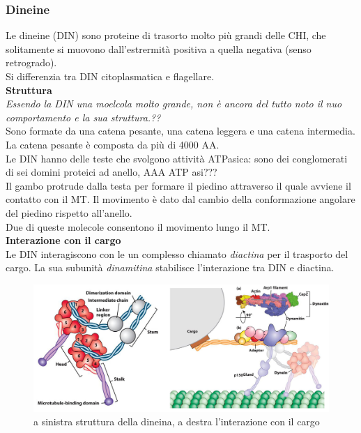         \subsubsection{Dineine}
            Le dineine (DIN) sono proteine di trasorto molto più grandi delle CHI, che solitamente si muovono dall'estrermità positiva a quella negativa (senso retrogrado). \\
            Si differenzia tra DIN citoplasmatica e flagellare.\\
            
            \textbf{Struttura}\\
                \textit{Essendo la DIN una moelcola molto grande, non è ancora del tutto noto il nuo comportamento e la sua struttura.??\\}
                Sono formate da una catena pesante, una catena leggera e una catena intermedia. La catena pesante è composta da più di 4000 AA.\\
                Le DIN hanno delle teste che svolgono attività ATPasica: sono dei conglomerati di sei domini proteici ad anello, AAA ATP asi???\\
                Il gambo protrude dalla testa per formare il piedino attraverso il quale avviene il contatto con il MT. Il movimento è dato dal cambio della conformazione angolare del piedino rispetto all'anello.\\
                Due di queste molecole consentono il movimento lungo il MT.\\
                
            \textbf{Interazione con il cargo}\\
                Le DIN interagiscono con le un complesso chiamato \textit{diactina} per il trasporto del cargo. La sua subunità \textit{dinamitina} stabilisce l'interazione tra DIN e diactina.
                \begin{figure}[h]
                    \centering
                    \includegraphics[width=1\textwidth]{images/dineina.JPG}
                    \caption{\small a sinistra struttura della dineina, a destra l'interazione con il cargo}
                    \label{fig:mesh1}
                \end{figure}
